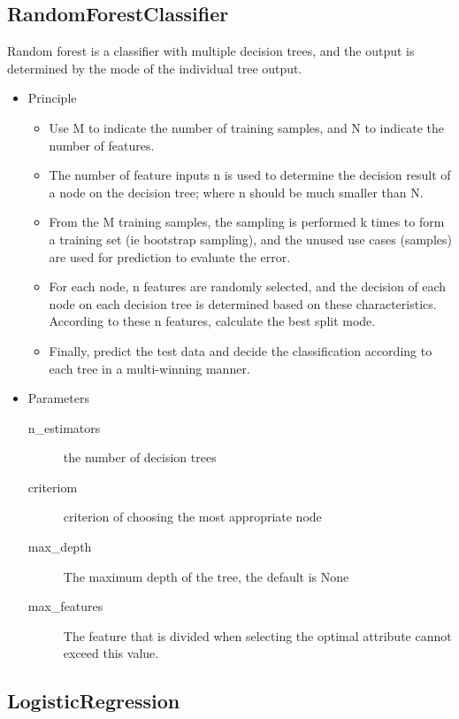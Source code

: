 \subsection{RandomForestClassifier}


Random forest is a classifier with 
multiple decision trees, and
the output is determined by 
the mode of the individual tree output.

\begin{itemize}
	\item Principle
	
	\begin{itemize}
		\item Use M to indicate the number of training samples, 
		and N to indicate the number of features.
		\item The number of feature inputs n is 
		used to determine the decision result 
		of a node on the decision tree; 
		where n should be much smaller than N.
		\item From the M training samples, 
		the sampling is performed k times to 
		form a training set (ie bootstrap sampling), 
		and the unused use cases (samples) are 
		used for prediction to evaluate the error.
		\item For each node, 
		n features are randomly selected, 
		and the decision of each node on each decision tree is 
		determined based on these characteristics. 
		According to these n features, 
		calculate the best split mode.
		\item Finally, predict the test data and 
		decide the classification 
		according to each tree in a multi-winning manner.
	\end{itemize}
	
	\item Parameters
	
	\begin{description}
		\item[n_estimators] the number of decision trees
		\item[criteriom] criterion of choosing 
		the most appropriate node
		\item[max_depth] The maximum depth of the tree, 
		the default is None 
		\item[max_features] The feature that is divided 
		when selecting the optimal attribute 
		cannot exceed this value.
	\end{description}

\end{itemize}


\subsection{LogisticRegression}

